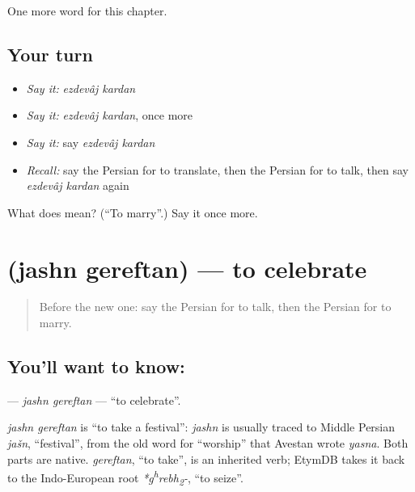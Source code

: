 \begin{grammarlens}[title={What you've built}]
One more word for this chapter.
\end{grammarlens}

\subsection*{Your turn}
\begin{itemize}
\raggedright
  \item \emph{Say it:} \emph{ezdevâj kardan}
  \item \emph{Say it:} \emph{ezdevâj kardan}, once more
  \item \emph{Say it:} say \emph{ezdevâj kardan}
  \item \emph{Recall:} say the Persian for to translate, then the Persian for to talk, then say \emph{ezdevâj kardan} again
\end{itemize}

\begin{tcolorbox}[breakable,colback=teal!4,colframe=teal!35!black,title={Before you move on}]
What does   mean? (\textquotedblleft{}To marry\textquotedblright{}.) Say it once more.
\end{tcolorbox}
\section[\texorpdfstring{\fa{جشن} \fa{گرفتن} (jashn gereftan)}{جشن گرفتن (jashn gereftan)}]{  (jashn gereftan) — to celebrate}

\label{lesson:FA-C183-jashn-gereftan}



\begin{quote}
Before the new one: say the Persian for to talk, then the Persian for to marry.
\end{quote}

\subsection*{You'll want to know:  }
\textbf{ } — \emph{jashn gereftan} — \textquotedblleft{}to celebrate\textquotedblright{}.

\begin{cousinweb}
\emph{jashn gereftan} is \textquotedblleft{}to take a festival\textquotedblright{}: \emph{jashn} is usually traced to Middle Persian \emph{jašn}, \textquotedblleft{}festival\textquotedblright{}, from the old word for \textquotedblleft{}worship\textquotedblright{} that Avestan wrote \emph{yasna}. Both parts are native. \emph{gereftan}, \textquotedblleft{}to take\textquotedblright{}, is an inherited verb; EtymDB takes it back to the Indo-European root \emph{*g\textsuperscript{h}rebh\textsubscript{2}-}, \textquotedblleft{}to seize\textquotedblright{}.
\end{cousinweb}


